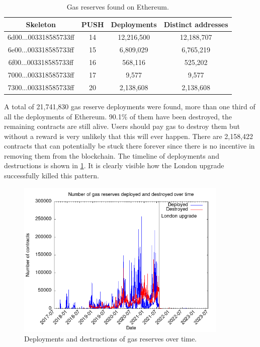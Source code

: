 \begin{table}[H]
\centering
    \begin{threeparttable}
    \begin{tabular}{ c c c c } 
    \toprule
    \textbf{Skeleton} & \textbf{PUSH} & \textbf{Deployments} & \textbf{Distinct addresses} \\
    \midrule  
    \small{6d00...003318585733ff} & 14 & 12,216,500 & 12,188,707 \\ [1.2ex]
    \small{6e00...003318585733ff} & 15 & 6,809,029 & 6,765,219 \\ [1.2ex]
    \small{6f00...003318585733ff} & 16 & 568,116 & 525,202 \\ [1.2ex]
    \small{7000...003318585733ff} & 17 & 9,577 & 9,577 \\ [1.2ex]
    \small{7300...003318585733ff} & 20 & 2,138,608 & 2,138,608 \\ [1.2ex]
    \bottomrule
    \end{tabular}
    \end{threeparttable}
    \caption{Gas reserves found on Ethereum.}
    \label{table:gas-reserve-deployments}
\end{table}

A total of 21,741,830 gas reserve deployments were found, more than one third of all the deployments of Ethereum. 90.1\% of them have been destroyed, the remaining contracts are still alive. Users should pay gas to destroy them but without a reward is very unlikely that this will ever happen. There are 2,158,422 contracts that can potentially be stuck there forever since there is no incentive in removing them from the blockchain. The timeline of deployments and destructions is shown in \cref{fig:gastokens-timeline}. It is clearly visible how the London upgrade successfully killed this pattern.

\begin{figure}[H]
    \centering
    \includegraphics[width=0.9\textwidth]{Figures/analysis/gastokens-timeline.png}
    \caption{Deployments and destructions of gas reserves over time.}
    \label{fig:gastokens-timeline}
\end{figure}

